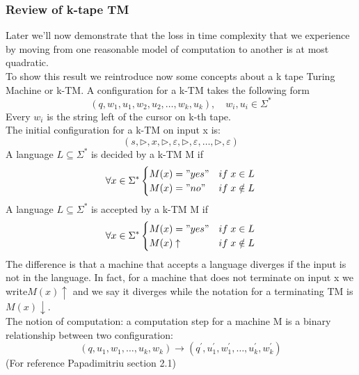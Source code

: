 \subsubsection{Review of k-tape TM}
Later we'll now demonstrate that the loss in time complexity that we experience by moving from one reasonable model of computation to another is at most quadratic.\\
To show this result we reintroduce now some concepts about a k tape Turing Machine or k-TM. A configuration for a k-TM takes the following form
\[ 
    (q,w_1,u_1,w_2,u_2,\ldots,w_k,u_k),\quad w_i,u_i \in \Sigma^*
\]
Every $w_i$ is the string left of the cursor on k-th tape.\\ The initial configuration for a k-TM on input x is:
\[ 
     (s,\triangleright,x,\triangleright,\varepsilon,\triangleright,\varepsilon, \ldots,\triangleright,\varepsilon)
\]
A language $L\subseteq \Sigma^*$ is decided by a k-TM M if
\[ 
    \forall x \in \Sigma^* 
     \begin{cases}
        M(x) = "yes" & if \; x\in L \\
        M(x) = "no" & if \; x \notin L 
     \end{cases}
\]
A language $L\subseteq \Sigma^*$ is accepted by a k-TM M if
\[ 
    \forall x \in \Sigma^* 
     \begin{cases}
        M(x) = "yes" & if \; x\in L \\
        M(x)\uparrow & if \; x \notin L 
     \end{cases}
\]The difference is that a machine that accepts a language diverges if the input is not in the language. In fact, for a machine that does not terminate on input x we write$ M(x) \uparrow $ and we say it diverges while the notation for a terminating TM is $ M(x) \downarrow $.\\
The notion of computation: a computation step for a machine M is a binary relationship between two configuration: \[ 
    (q, u_{1},w_{1}, \ldots,u_{k},w_{k}) \longrightarrow (q^{'},u_{1}^{'},w_{1}^{'}, \ldots,u_{k}^{'},w_{k}^{'})
\]
(For reference Papadimitriu section 2.1)


